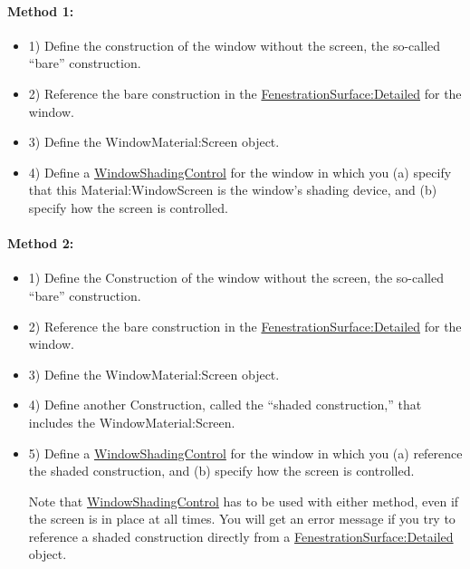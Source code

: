 \paragraph{Method 1:}\label{method-1-2}
\begin{itemize}
\item 1) Define the construction of the window without the screen, the so-called ``bare'' construction.

\item 2) Reference the bare construction in the \hyperref[fenestrationsurfacedetailed]{FenestrationSurface:Detailed} for the window.

\item 3) Define the WindowMaterial:Screen object.

\item 4) Define a \hyperref[windowpropertyshadingcontrol]{WindowShadingControl} for the window in which you (a) specify that this Material:WindowScreen is the window's shading device, and (b) specify how the screen is controlled.

\end{itemize}

\paragraph{Method 2:}\label{method-2-2}

\begin{itemize}
\item 1) Define the Construction of the window without the screen, the so-called ``bare'' construction.

\item 2) Reference the bare construction in the \hyperref[fenestrationsurfacedetailed]{FenestrationSurface:Detailed} for the window.

\item 3) Define the WindowMaterial:Screen object.

\item 4) Define another Construction, called the ``shaded construction,'' that includes the WindowMaterial:Screen.

\item 5) Define a \hyperref[windowpropertyshadingcontrol]{WindowShadingControl} for the window in which you (a) reference the shaded construction, and (b) specify how the screen is controlled.

Note that \hyperref[windowpropertyshadingcontrol]{WindowShadingControl} has to be used with either method, even if the screen is in place at all times. You will get an error message if you try to reference a shaded construction directly from a \hyperref[fenestrationsurfacedetailed]{FenestrationSurface:Detailed} object.

\end{itemize}

